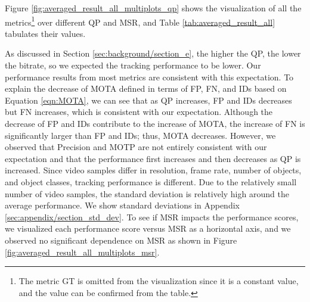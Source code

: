 Figure \ref{fig:averaged_result_all_multiplots_qp} shows the visualization of all the metrics\footnote{The metric GT is omitted from the visualization since it is a constant value, and the value can be confirmed from the table.} over different QP and MSR, and Table \ref{tab:averaged_result_all} tabulates their values.


As discussed in Section \ref{sec:background/section_e}, the higher the QP, the lower the bitrate, so we expected the tracking performance to be lower. Our performance results from most metrics are consistent with this expectation. To explain the decrease of MOTA defined in terms of FP, FN, and IDs based on Equation \eqref{eqn:MOTA}, we can see that as QP increases, FP and IDs decreases but FN increases, which is consistent with our expectation. Although the decrease of FP and IDs contribute to the increase of MOTA, the increase of FN is significantly larger than FP and IDs; thus, MOTA decreases. However, we observed that Precision and MOTP are not entirely consistent with our expectation and that the performance first increases and then decreases as QP is increased. Since video samples differ in resolution, frame rate, number of objects, and object classes, tracking performance is different. Due to the relatively small number of video samples, the standard deviation is relatively high around the average performance. We show standard deviations in Appendix \ref{sec:appendix/section_std_dev}. To see if MSR impacts the performance scores, we visualized each performance score versus MSR as a horizontal axis, and we observed no significant dependence on MSR as shown in Figure \ref{fig:averaged_result_all_multiplots_msr}.



